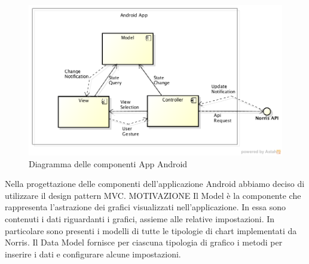 	\begin{figure}[H]\centering
        \includegraphics[width=\textwidth]{SpecificaTecnica/Pics/AndroidAppComponentDiagramLevel0.png}
        \caption{Diagramma delle componenti App Android}
    \end{figure}
	Nella progettazione delle componenti dell'applicazione Android abbiamo deciso di utilizzare il design pattern MVC.
	MOTIVAZIONE
        Il Model è la componente che rappresenta l'astrazione dei grafici visualizzati nell'applicazione. In essa sono contenuti i dati riguardanti i grafici, assieme alle relative impostazioni. In particolare sono presenti i modelli di tutte le tipologie di chart implementati da Norris. Il Data Model fornisce per ciascuna tipologia di grafico i metodi per inserire i dati e configurare alcune impostazioni. 
    
